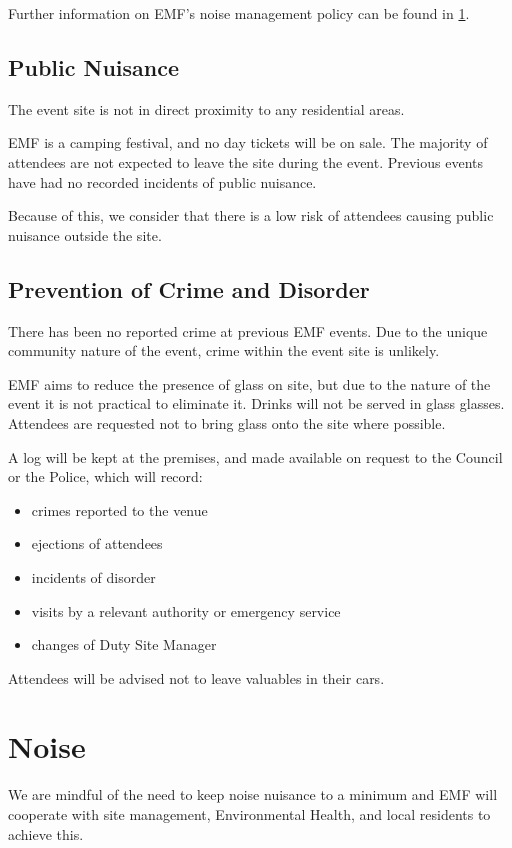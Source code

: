Further information on EMF's noise management policy can be found in
\cref{noise}.

\subsection{Public Nuisance}

The event site is not in direct proximity to any residential areas.

EMF is a camping festival, and no day tickets will be on sale. The majority of
attendees are not expected to leave the site during the event. Previous events
have had no recorded incidents of public nuisance.

Because of this, we consider that there is a low risk of attendees causing
public nuisance outside the site.

\subsection{Prevention of Crime and Disorder}

There has been no reported crime at previous EMF events. Due to the unique
community nature of the event, crime within the event site is unlikely.

EMF aims to reduce the presence of glass on site, but due to the nature of the
event it is not practical to eliminate it. Drinks will not be served in glass glasses.
Attendees are requested not to bring glass onto the site where possible.

A log will be kept at the premises, and made available on request to the Council
or the Police, which will record:

\begin{itemize}
    \tightlist
    \item crimes reported to the venue
    \item ejections of attendees
    \item incidents of disorder
    \item visits by a relevant authority or emergency service
    \item changes of Duty Site Manager
\end{itemize}

Attendees will be advised not to leave valuables in their cars.

\newpage

\section{Noise}
\label{noise}
We are mindful of the need to keep noise nuisance to a minimum and
EMF will cooperate with site management, Environmental Health, and local
residents to achieve this.

